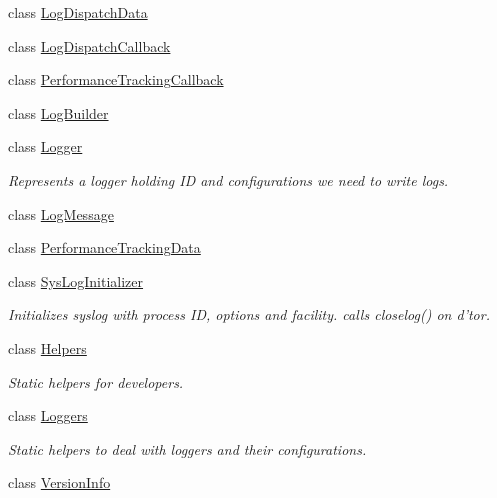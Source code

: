 \begin{DoxyCompactItemize}
class \hyperlink{classel_1_1LogDispatchData}{Log\-Dispatch\-Data}
\item 
class \hyperlink{classel_1_1LogDispatchCallback}{Log\-Dispatch\-Callback}
\item 
class \hyperlink{classel_1_1PerformanceTrackingCallback}{Performance\-Tracking\-Callback}
\item 
class \hyperlink{classel_1_1LogBuilder}{Log\-Builder}
\item 
class \hyperlink{classel_1_1Logger}{Logger}
\begin{DoxyCompactList}\small\item\em Represents a logger holding I\-D and configurations we need to write logs. \end{DoxyCompactList}\item 
class \hyperlink{classel_1_1LogMessage}{Log\-Message}
\item 
class \hyperlink{classel_1_1PerformanceTrackingData}{Performance\-Tracking\-Data}
\item 
class \hyperlink{classel_1_1SysLogInitializer}{Sys\-Log\-Initializer}
\begin{DoxyCompactList}\small\item\em Initializes syslog with process I\-D, options and facility. calls closelog() on d'tor. \end{DoxyCompactList}\item 
class \hyperlink{classel_1_1Helpers}{Helpers}
\begin{DoxyCompactList}\small\item\em Static helpers for developers. \end{DoxyCompactList}\item 
class \hyperlink{classel_1_1Loggers}{Loggers}
\begin{DoxyCompactList}\small\item\em Static helpers to deal with loggers and their configurations. \end{DoxyCompactList}\item 
class \hyperlink{classel_1_1VersionInfo}{Version\-Info}
\end{DoxyCompactItemize}
